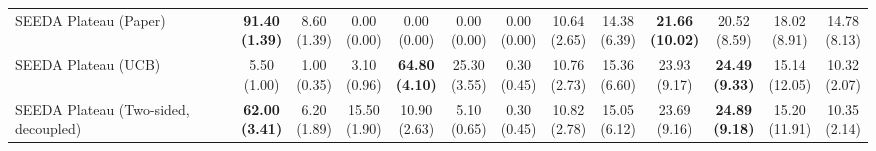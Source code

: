 \begin{table}[H]
{\begin{tabular}{l|cccccc|cccccc}
SEEDA Plateau (Paper) & \bfseries \makecell{91.40 \\ (1.39)} & \makecell{8.60 \\ (1.39)} & {\cellcolor[HTML]{C8E6C9}} \makecell{0.00 \\ (0.00)} & \makecell{0.00 \\ (0.00)} & \makecell{0.00 \\ (0.00)} & \makecell{0.00 \\ (0.00)} & \makecell{10.64 \\ (2.65)} & \makecell{14.38 \\ (6.39)} & {\cellcolor[HTML]{C8E6C9}} \bfseries \makecell{21.66 \\ (10.02)} & \makecell{20.52 \\ (8.59)} & \makecell{18.02 \\ (8.91)} & \makecell{14.78 \\ (8.13)} \\
SEEDA Plateau (UCB) & \makecell{5.50 \\ (1.00)} & \makecell{1.00 \\ (0.35)} & {\cellcolor[HTML]{C8E6C9}} \makecell{3.10 \\ (0.96)} & \bfseries \makecell{64.80 \\ (4.10)} & \makecell{25.30 \\ (3.55)} & \makecell{0.30 \\ (0.45)} & \makecell{10.76 \\ (2.73)} & \makecell{15.36 \\ (6.60)} & {\cellcolor[HTML]{C8E6C9}} \makecell{23.93 \\ (9.17)} & \bfseries \makecell{24.49 \\ (9.33)} & \makecell{15.14 \\ (12.05)} & \makecell{10.32 \\ (2.07)} \\
SEEDA Plateau (Two-sided, decoupled) & \bfseries \makecell{62.00 \\ (3.41)} & \makecell{6.20 \\ (1.89)} & {\cellcolor[HTML]{C8E6C9}} \makecell{15.50 \\ (1.90)} & \makecell{10.90 \\ (2.63)} & \makecell{5.10 \\ (0.65)} & \makecell{0.30 \\ (0.45)} & \makecell{10.82 \\ (2.78)} & \makecell{15.05 \\ (6.12)} & {\cellcolor[HTML]{C8E6C9}} \makecell{23.69 \\ (9.16)} & \bfseries \makecell{24.89 \\ (9.18)} & \makecell{15.20 \\ (11.91)} & \makecell{10.35 \\ (2.14)} \\

\end{tabular}}
\end{table}
